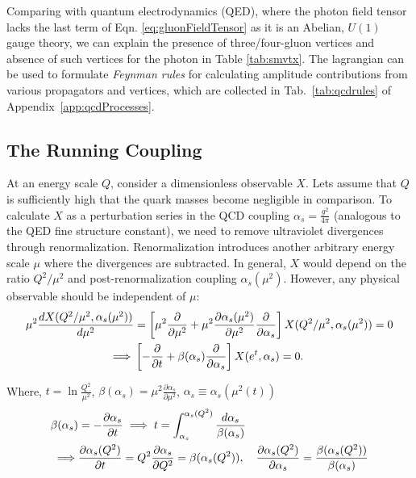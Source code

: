 Comparing with quantum electrodynamics (QED), where the photon field tensor lacks the last term of Eqn. \ref{eq:gluonFieldTensor} as it is an Abelian, \(U(1)\) gauge theory, we can explain the presence of three/four-gluon vertices and absence of such vertices for the photon in Table \ref{tab:smvtx}. The lagrangian can be used to formulate \emph{Feynman rules} for calculating amplitude contributions from various propagators and vertices, which are collected in Tab.~\ref{tab:qcdrules} of Appendix~\ref{app:qcdProcesses}. 

\subsection{The Running Coupling}
\label{subsec:runningCoupling}
At an energy scale \(Q\), consider a dimensionless observable \(X\). Lets assume that \(Q\) is sufficiently high that the quark masses become negligible in comparison. To calculate \(X\) as a perturbation series in the QCD coupling \(\alpha_s = \frac{g^2}{4\pi}\) (analogous to the QED fine structure constant), we need to remove ultraviolet divergences through renormalization. Renormalization introduces another arbitrary energy scale $\mu$ where the divergences are subtracted.  In general, \(X\) would depend on the ratio \(Q^2/\mu^2\) and post-renormalization coupling $\alpha_s(\mu^2)$. However, any physical observable should be independent of $\mu$:
\begin{align}
	\mu^2\frac{d X(Q^2/\mu^2, \alpha_s(\mu^2))}{d\mu^2} &= \left[\mu^2\frac{\partial}{\partial\mu^2} +  \mu^2\frac{\partial\alpha_s(\mu^2)}{\partial\mu^2}\frac{\partial}{\partial\alpha_s}\right] X(Q^2/\mu^2, \alpha_s(\mu^2)) = 0 \notag\\
	\implies & \left[-\frac{\partial}{\partial t} + \beta(\alpha_s) \frac{\partial}{\partial\alpha_s}\right] X(e^t, \alpha_s) = 0.
	\label{eqn:renormX}
\end{align} 

Where, \(t = \ln{\frac{Q^2}{\mu^2}}\), \(\beta(\alpha_s) = \mu^2\frac{\partial\alpha_s}{\partial\mu^2}\), \(\alpha_s\equiv\alpha_s(\mu^2(t))\)
\begin{align}
	\beta(\alpha_s) &= -\frac{\partial\alpha_s}{\partial t} \implies  t =  \int^{\alpha_s(Q^2)}_{\alpha_s}\frac{d\alpha_s}{\beta(\alpha_s)}\notag\\
			\implies & \frac{\partial\alpha_s(Q^2)}{\partial t} = Q^2\frac{\partial \alpha_s}{\partial Q^2}  =  \beta(\alpha_s(Q^2)), \quad\frac{\partial\alpha_s(Q^2)}{\partial\alpha_s} = \frac{\beta(\alpha_s(Q^2))}{\beta(\alpha_s)}
					\label{eq:runningCouplingIntro}
\end{align}

